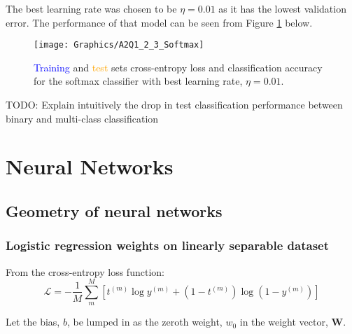 \documentclass[a4paper,12pt]{article}
\begin{document}
The best learning rate was chosen to be $\eta = 0.01$ as it has the lowest validation error. The performance of that model can be seen from Figure \ref{figure:Softmax} below.

\begin{figure}[!htb]
\centering
\texttt{[image: Graphics/A2Q1\_2\_3\_Softmax]}
\caption{\label{figure:Softmax} \textcolor{blue}{Training} and \textcolor{orange}{test} sets cross-entropy loss and classification accuracy for the softmax classifier with best learning rate, $\eta = 0.01$.}
\end{figure}

TODO: Explain intuitively the drop in test classification performance between binary and multi-class classification


\clearpage
\section{Neural Networks}
\subsection{Geometry of neural networks}
\subsubsection{Logistic regression weights on linearly separable dataset}
\label{section:linearlySeparableProblem}

From the cross-entropy loss function:
\begin{equation}
\label{equation:crossEntropyLoss}
\mathcal{L} = - \frac{1}{M} \sum_m^M \left[ t^{(m)} \log y^{(m)} +
	\left(1 - t^{(m)} \right) \log \left( 1 - y^{(m)} \right) \right]
\end{equation}

Let the bias, $b$, be lumped in as the zeroth weight, $w_0$ in the weight vector, $\mathbf{W}$.
\end{document}
